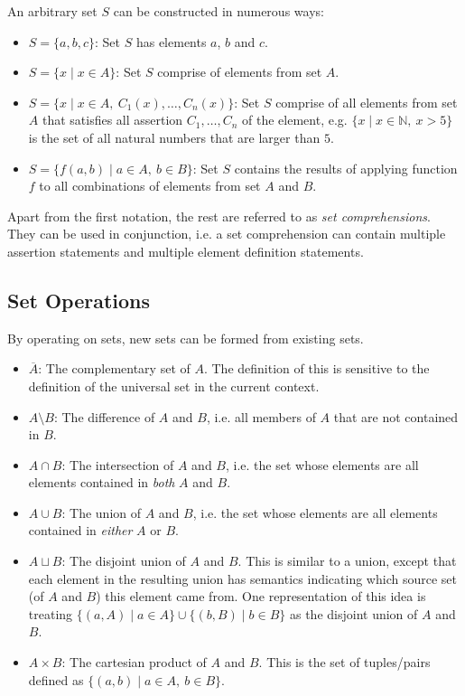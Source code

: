 \documentclass[12pt]{article}
\theoremstyle{definition}
\newcommand{\NN}{\mathbb{N}}
\newcommand{\bras}[1]{\lbrace #1 \rbrace}
\begin{document}
	An arbitrary set $S$ can be constructed in numerous ways:
	\begin{itemize}
		\item $S = \bras{a, b, c}$: Set $S$ has elements $a$, $b$ and $c$.
		\item $S = \bras{x \mid x \in A}$: Set $S$ comprise of elements from set $A$.
		\item $S = \bras{x \mid x \in A,\ C_1(x), \dots, C_n(x)}$: Set $S$ comprise of all elements from set $A$ that satisfies all assertion $C_1, \dots, C_n$ of the element, e.g. $\bras{x \mid x \in \NN,\ x > 5}$ is the set of all natural numbers that are larger than $5$.
		\item $S = \bras{f(a, b) \mid a \in A,\ b \in B}$: Set $S$ contains the results of applying function $f$ to all combinations of elements from set $A$ and $B$.
	\end{itemize}
	
	Apart from the first notation, the rest are referred to as \emph{set comprehensions}. They can be used in conjunction, i.e. a set comprehension can contain multiple assertion statements and multiple element definition statements.
	
	\subsection{Set Operations}
	
	By operating on sets, new sets can be formed from existing sets.
	
	\begin{itemize}
		\item $\overline{A}$: The complementary set of $A$. The definition of this is sensitive to the definition of the universal set in the current context.
		\item $A \setminus B$: The difference of $A$ and $B$, i.e. all members of $A$ that are not contained in $B$.
		\item $A \cap B$: The intersection of $A$ and $B$, i.e. the set whose elements are all elements contained in \emph{both} $A$ and $B$.
		\item $A \cup B$: The union of $A$ and $B$, i.e. the set whose elements are all elements contained in \emph{either} $A$ or $B$.
		\item $A \sqcup B$: The disjoint union of $A$ and $B$. This is similar to a union, except that each element in the resulting union has semantics indicating which source set (of $A$ and $B$) this element came from. One representation of this idea is treating $\bras{(a, A) \mid a \in A} \cup \bras{(b, B) \mid b \in B}$ as the disjoint union of $A$ and $B$.
		\item $A \times B$: The cartesian product of $A$ and $B$. This is the set of tuples/pairs defined as $\bras{(a, b) \mid a \in A,\ b \in B}$.
	\end{itemize}
	
\end{document}
